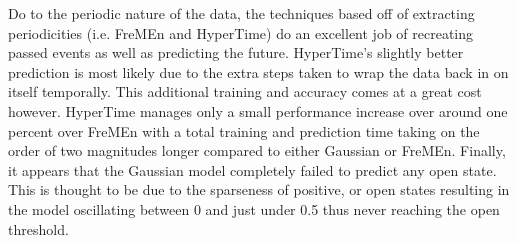 Do to the periodic nature of the data, the techniques based off of extracting
periodicities (i.e. FreMEn and HyperTime) do an excellent job of recreating
passed events as well as predicting the future. HyperTime's slightly better
prediction is most likely due to the extra steps taken to wrap the data back
in on itself temporally.  This additional training and accuracy comes at a
great cost however. HyperTime manages only a small performance increase over
around one percent over FreMEn with a total training and prediction time
taking on the order of two magnitudes longer compared to either Gaussian or FreMEn.
Finally, it appears that the Gaussian model completely failed to predict any
open state.  This is thought to be due to the sparseness of positive, or open
states resulting in the model oscillating between 0 and just under 0.5 thus
never reaching the open threshold. \\

%
%

